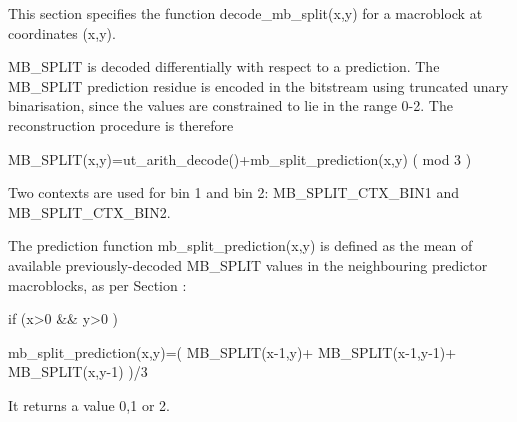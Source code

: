 This section specifies the function decode\_mb\_split(x,y) for a
macroblock at coordinates (x,y).

MB\_SPLIT is decoded differentially with respect to a prediction. The
MB\_SPLIT prediction residue is encoded in the bitstream using truncated
unary binarisation, since the values are constrained to lie in the range
0-2. The reconstruction procedure is therefore

MB\_SPLIT(x,y)=ut\_arith\_decode()+mb\_split\_prediction(x,y) ( mod 3 )

Two contexts are used for bin 1 and bin 2: MB\_SPLIT\_CTX\_BIN1 and
MB\_SPLIT\_CTX\_BIN2.

The prediction function mb\_split\_prediction(x,y) is defined as the mean
of available previously-decoded MB\_SPLIT values in the neighbouring
predictor macroblocks, as per Section :

if (x>0 \&\& y>0 )

    mb\_split\_prediction(x,y)=( MB\_SPLIT(x-1,y)+ MB\_SPLIT(x-1,y-1)+
MB\_SPLIT(x,y-1) )/3

 It returns a value 0,1 or 2.



